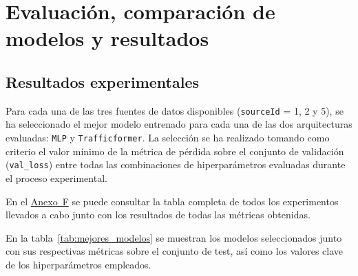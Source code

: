 \section*{Evaluación, comparación de modelos y resultados}
\label{sec:evaluacion}

%
%


\subsection{Resultados experimentales}
\label{sec:resultados_exp}

Para cada una de las tres fuentes de datos disponibles (\texttt{sourceId} = 1, 2 y 5), se ha seleccionado el mejor modelo entrenado para cada una de las dos arquitecturas evaluadas: \texttt{MLP} y \texttt{Trafficformer}. La selección se ha realizado tomando como criterio el valor mínimo de la métrica de pérdida sobre el conjunto de validación (\texttt{val\_loss}) entre todas las combinaciones de hiperparámetros evaluadas durante el proceso experimental.

En el \hyperref[anexo:resultados_exp]{Anexo~F} se puede consultar la tabla completa de todos los experimentos llevados a cabo junto con los resultados de todas las métricas obtenidas.

En la tabla~\ref{tab:mejores_modelos} se muestran los modelos seleccionados junto con sus respectivas métricas sobre el conjunto de test, así como los valores clave de los hiperparámetros empleados.


